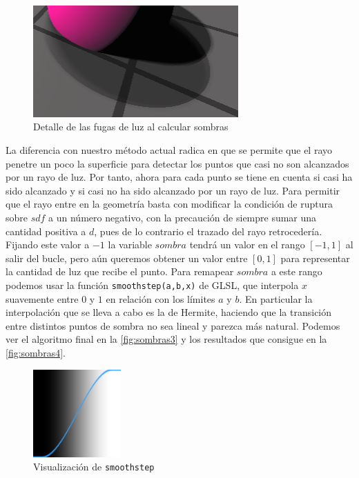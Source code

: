 \begin{figure}[ht!]
    \centering
    \includegraphics[width=0.7\textwidth]{Plantilla-TFG-master/img/shadowArtifactZoom.png}
    \caption{Detalle de las fugas de luz al calcular sombras}
    \label{fig:artifactZoom}
\end{figure}

La diferencia con nuestro método actual radica en que se permite que el rayo penetre un poco la superficie para detectar los puntos que casi no son alcanzados por un rayo de luz. Por tanto, ahora para cada punto se tiene en cuenta si casi ha sido alcanzado y si casi no ha sido alcanzado por un rayo de luz. Para permitir que el rayo entre en la geometría basta con modificar la condición de ruptura sobre $sdf$ a un número negativo, con la precaución de siempre sumar una cantidad positiva a $d$, pues de lo contrario el trazado del rayo retrocedería. Fijando este valor a $-1$ la variable $sombra$ tendrá un valor en el rango $[-1,1]$ al salir del bucle, pero aún queremos obtener un valor entre $[0,1]$ para representar la cantidad de luz que recibe el punto. Para remapear $sombra$ a este rango podemos usar la función \texttt{smoothstep(a,b,x)} de GLSL, que interpola $x$ suavemente entre $0$ y $1$ en relación con los límites $a$ y $b$. En particular la interpolación que se lleva a cabo es la de Hermite, haciendo que la transición entre distintos puntos de sombra no sea lineal y parezca más natural. Podemos ver el algoritmo final en la \autoref{fig:sombras3} y los resultados que consigue en la \autoref{fig:sombras4}.

\begin{figure}[ht!]
    \centering
    \includegraphics[width=0.3\textwidth]{Plantilla-TFG-master/img/smoothstep.png}
    \caption{Visualización de \texttt{smoothstep} \cite{smoothstep}}
    \label{fig:miss}
\end{figure}

